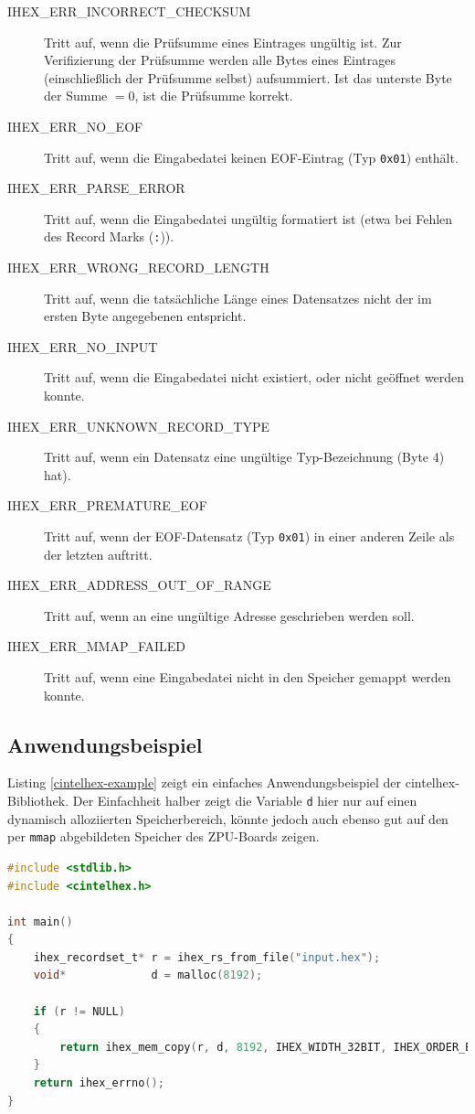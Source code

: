 \documentclass[11pt]{scrartcl}
\begin{document}
\begin{description}
	\item[IHEX\_ERR\_INCORRECT\_CHECKSUM] Tritt auf, wenn die Prüfsumme eines Eintrages ungültig ist. Zur Verifizierung der Prüfsumme werden alle Bytes eines Eintrages (einschließlich der Prüfsumme selbst) aufsummiert. Ist das unterste Byte der Summe $=0$, ist die Prüfsumme korrekt.
	\item[IHEX\_ERR\_NO\_EOF] Tritt auf, wenn die Eingabedatei keinen EOF-Eintrag (Typ \texttt{0x01}) enthält.
	\item[IHEX\_ERR\_PARSE\_ERROR] Tritt auf, wenn die Eingabedatei ungültig formatiert ist (etwa bei Fehlen des Record Marks (\texttt{:})).
	\item[IHEX\_ERR\_WRONG\_RECORD\_LENGTH] Tritt auf, wenn die tatsächliche Länge eines Datensatzes nicht der im ersten Byte angegebenen entspricht.
	\item[IHEX\_ERR\_NO\_INPUT] Tritt auf, wenn die Eingabedatei nicht existiert, oder nicht geöffnet werden konnte.
	\item[IHEX\_ERR\_UNKNOWN\_RECORD\_TYPE] Tritt auf, wenn ein Datensatz eine ungültige Typ-Bezeichnung (Byte 4) hat).
	\item[IHEX\_ERR\_PREMATURE\_EOF] Tritt auf, wenn der EOF-Datensatz (Typ \texttt{0x01}) in einer anderen Zeile als der letzten auftritt.
	\item[IHEX\_ERR\_ADDRESS\_OUT\_OF\_RANGE] Tritt auf, wenn an eine ungültige Adresse geschrieben werden soll.
	\item[IHEX\_ERR\_MMAP\_FAILED] Tritt auf, wenn eine Eingabedatei nicht in den Speicher gemappt werden konnte.
\end{description}

\subsection{Anwendungsbeispiel}

Listing \ref{cintelhex-example} zeigt ein einfaches Anwendungsbeispiel der cintelhex-Bibliothek. Der Einfachheit halber zeigt die Variable \texttt{d} hier nur auf einen dynamisch alloziierten Speicherbereich, könnte jedoch auch ebenso gut auf den per \texttt{mmap} abgebildeten Speicher des ZPU-Boards zeigen.

\begin{lstlisting}[language=C,caption=Anwendungsbeispiel der cintelhex-Bibliothek,label=cintelhex-example,float=bpt]
#include <stdlib.h>
#include <cintelhex.h>

int main()
{
	ihex_recordset_t* r = ihex_rs_from_file("input.hex");
	void*             d = malloc(8192);
	
	if (r != NULL)
	{
		return ihex_mem_copy(r, d, 8192, IHEX_WIDTH_32BIT, IHEX_ORDER_BIGENDIAN);
	}
	return ihex_errno();
}
\end{lstlisting}
\end{document}
